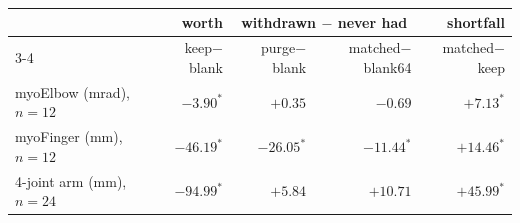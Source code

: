 \begin{tabular}{@{}lrrrr@{}}
\toprule
 & worth & \multicolumn{2}{c}{withdrawn $-$ never had} & shortfall\\
\cmidrule(lr){3-4}
 & keep$-$blank & purge$-$blank & matched$-$blank64 & matched$-$keep\\
\midrule
myoElbow (mrad), $n{=}12$ & $-3.90^{*}$ & $+0.35$ & $-0.69$ & $+7.13^{*}$ \\
myoFinger (mm), $n{=}12$ & $-46.19^{*}$ & $-26.05^{*}$ & $-11.44^{*}$ & $+14.46^{*}$ \\
4-joint arm (mm), $n{=}24$ & $-94.99^{*}$ & $+5.84$ & $+10.71$ & $+45.99^{*}$ \\
\bottomrule
\end{tabular}
